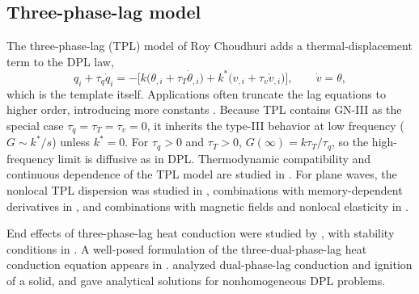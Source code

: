 \subsection{Three-phase-lag model}
The three-phase-lag (TPL) model of Roy Choudhuri \citep{RoyChoudhuri2007} adds a thermal-displacement term to the DPL law,
\begin{equation}
q_i+\tau_q\dot q_i=-\bigl[k\bigl(\theta_{,i}+\tau_T\dot\theta_{,i}\bigr)+k^*\bigl(v_{,i}+\tau_v\dot v_{,i}\bigr)\bigr],\qquad \dot v=\theta,\label{eq:tpl}
\end{equation}
which is the template itself. Applications often truncate the lag equations to higher order, introducing more constants \citep{Abouelregal2020,Abouelregal2020a}. Because TPL contains GN-III as the special case $\tau_q=\tau_T=\tau_v=0$, it inherits the type-III behavior at low frequency ($G\sim k^*/s$) unless $k^*=0$. For $\tau_q>0$ and $\tau_T>0$, $G(\infty)=k\tau_T/\tau_q$, so the high-frequency limit is diffusive as in DPL. Thermodynamic compatibility and continuous dependence of the TPL model are studied in \citep{Chirita2016}. For plane waves, the nonlocal TPL dispersion was studied in \citep{Tiwari2021}, combinations with memory-dependent derivatives in \citep{Singh2019,Singh2020a,Biswas2019}, and combinations with magnetic fields and nonlocal elasticity in \citep{Bayones2021}.

End effects of three-phase-lag heat conduction were studied by \citep{Quintanilla2008}, with stability conditions in \citep{Quintanilla2008a}. A well-posed formulation of the three-dual-phase-lag heat conduction equation appears in \citep{Quintanilla2009}. \citep{Antaki2000} analyzed dual-phase-lag conduction and ignition of a solid, and \citep{Julius2017} gave analytical solutions for nonhomogeneous DPL problems.

